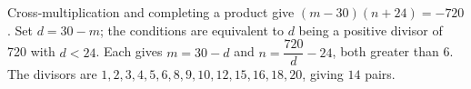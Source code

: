 Cross-multiplication and completing a product give $(m-30)(n+24)=-720$. Set $d=30-m$; the conditions are equivalent to $d$ being a positive divisor of 720 with $d<24$. Each gives $m=30-d$ and $n=\dfrac{720}{d}-24$, both greater than 6. The divisors are $1,2,3,4,5,6,8,9,10,12,15,16,18,20$, giving $\boxed{14}$ pairs.

